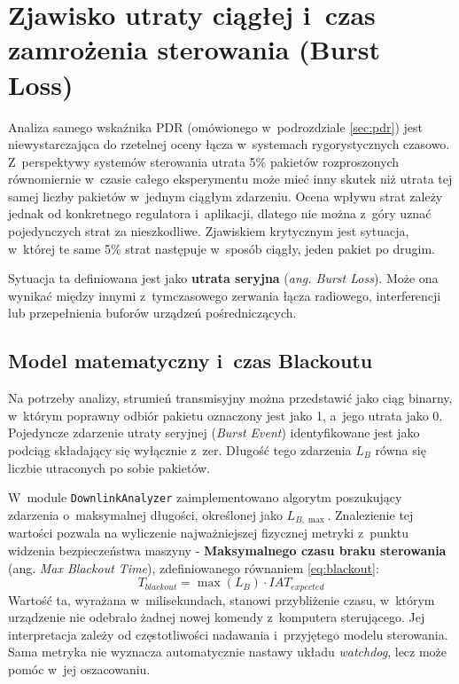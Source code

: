 \section{Zjawisko utraty ciągłej i~czas zamrożenia sterowania (Burst Loss)}
\label{sec:burst_loss}

Analiza samego wskaźnika PDR (omówionego w~podrozdziale \ref{sec:pdr}) jest niewystarczająca do rzetelnej oceny łącza w~systemach rygorystycznych czasowo.
Z~perspektywy systemów sterowania utrata 5\% pakietów rozproszonych równomiernie w~czasie całego eksperymentu może mieć inny skutek niż utrata tej samej liczby pakietów w~jednym ciągłym zdarzeniu.
Ocena wpływu strat zależy jednak od konkretnego regulatora i~aplikacji, dlatego nie można z~góry uznać pojedynczych strat za nieszkodliwe.
Zjawiskiem krytycznym jest sytuacja, w~której te same 5\% strat następuje w~sposób ciągły, jeden pakiet po drugim.

Sytuacja ta definiowana jest jako \textbf{utrata seryjna} (\textit{ang. Burst Loss}).
Może ona wynikać między innymi z~tymczasowego zerwania łącza radiowego, interferencji lub przepełnienia buforów urządzeń pośredniczących.

\subsection{Model matematyczny i~czas Blackoutu}

Na potrzeby analizy, strumień transmisyjny można przedstawić jako ciąg binarny, w~którym poprawny odbiór pakietu oznaczony jest jako 1, a~jego utrata jako 0.
Pojedyncze zdarzenie utraty seryjnej (\textit{Burst Event}) identyfikowane jest jako podciąg składający się wyłącznie z~zer.
Długość tego zdarzenia $L_B$ równa się liczbie utraconych po sobie pakietów.

W~module \texttt{DownlinkAnalyzer} zaimplementowano algorytm poszukujący zdarzenia o~maksymalnej długości, określonej jako $L_{B,\max}$.
Znalezienie tej wartości pozwala na wyliczenie najważniejszej fizycznej metryki z~punktu widzenia bezpieczeństwa maszyny - \textbf{Maksymalnego czasu braku sterowania} (ang.
\textit{Max Blackout Time}), zdefiniowanego równaniem \ref{eq:blackout}:
\begin{equation}
    T_{blackout} = \max(L_B) \cdot IAT_{expected} \label{eq:blackout} \end{equation} Wartość ta, wyrażana w~milisekundach, stanowi przybliżenie czasu, w~którym urządzenie nie odebrało żadnej nowej komendy z~komputera sterującego.
Jej interpretacja zależy od częstotliwości nadawania i~przyjętego modelu sterowania.
Sama metryka nie wyznacza automatycznie nastawy układu \textit{watchdog}, lecz może pomóc w~jej oszacowaniu.

